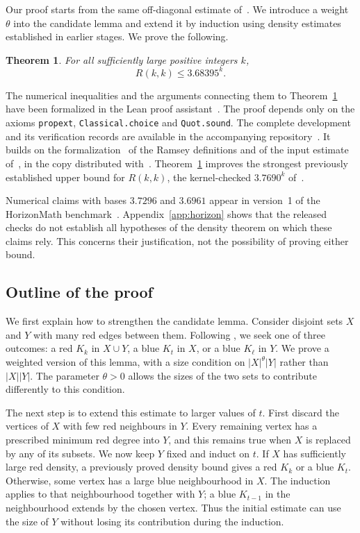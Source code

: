 \documentclass[11pt]{article}
\newtheorem{theorem}{Theorem}[section]
\theoremstyle{definition}
\theoremstyle{remark}
\numberwithin{equation}{section}
\begin{document}
Our proof starts from the same off-diagonal estimate of~\cite{GNNW}.
We introduce a weight $\theta$ into the candidate lemma and extend
it by induction using density estimates established in earlier stages.
We prove the following.

\begin{theorem}\label{thm:main}
For all sufficiently large positive integers $k$,
\[
 R(k,k)\le 3.68395^k.
\]
\end{theorem}

The numerical inequalities and the arguments connecting them to
Theorem~\ref{thm:main} have been formalized in the Lean proof
assistant~\cite{Lean4}. The proof depends only on the axioms
\textup{\texttt{propext}}, \textup{\texttt{Classical.choice}} and
\textup{\texttt{Quot.sound}}. The complete development and its
verification records are available in the accompanying
repository~\cite{Artifact}. It builds on the
formalization~\cite{GNNWLean} of the Ramsey definitions and of the
input estimate of~\cite{GNNW}, in the copy distributed
with~\cite{NSS}. Theorem~\ref{thm:main} improves the strongest
previously established upper bound for $R(k,k)$, the kernel-checked
$3.7690^k$ of~\cite{NSS}.

Numerical claims with bases $3.7296$ and $3.6961$ appear in version~1
of the HorizonMath benchmark~\cite{Horizon,HorizonCode}.
Appendix~\ref{app:horizon} shows that the released checks do not
establish all hypotheses of the density theorem on which these
claims rely. This concerns their justification, not the possibility
of proving either bound.

\subsection{Outline of the proof}

We first explain how to strengthen the candidate lemma. Consider
disjoint sets $X$ and $Y$ with many red edges between them. Following
\cite{GNNW}, we seek one of three outcomes: a red $K_k$ in $X\cup Y$,
a blue $K_t$ in $X$, or a blue $K_\ell$ in $Y$. We prove a weighted
version of this lemma, with a size condition on
$|X|^\theta|Y|$ rather than $|X||Y|$. The parameter $\theta>0$ allows
the sizes of the two sets to contribute differently to this condition.

The next step is to extend this estimate to larger values of $t$.
First discard the vertices of $X$ with few red neighbours in $Y$.
Every remaining vertex has a prescribed minimum red degree into $Y$,
and this remains true when $X$ is replaced by any of its subsets. We
now keep $Y$ fixed and induct on $t$. If $X$ has sufficiently large
red density, a previously proved density bound gives a red $K_k$ or
a blue $K_t$. Otherwise, some vertex has a large blue neighbourhood
in $X$. The induction applies to that neighbourhood together with $Y$;
a blue $K_{t-1}$ in the neighbourhood extends by the chosen vertex.
Thus the initial estimate can use the size of $Y$ without losing its
contribution during the induction.
\end{document}
